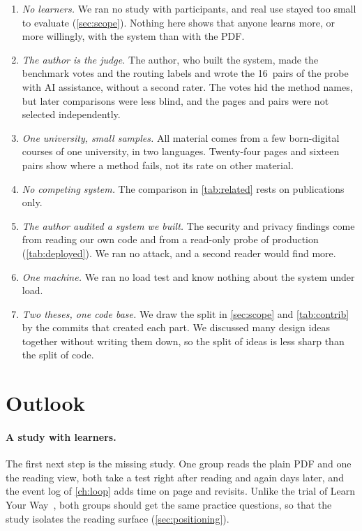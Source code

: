\begin{enumerate}
  \item \emph{No learners.} We ran no study with participants, and real use
    stayed too small to evaluate (\cref{sec:scope}). Nothing here shows that
    anyone learns more, or more willingly, with the system than with the PDF.
  \item \emph{The author is the judge.} The author, who built the system, made
    the benchmark votes and the routing labels and wrote the 16~pairs of the
    probe with AI assistance, without a second rater. The votes hid the method
    names, but later comparisons were less blind, and the pages and pairs were
    not selected independently.
  \item \emph{One university, small samples.} All material comes from a few
    born-digital courses of one university, in two languages. Twenty-four
    pages and sixteen pairs show where a method fails, not its rate on other
    material.
  \item \emph{No competing system.} The comparison in \cref{tab:related} rests
    on publications only.
  \item \emph{The author audited a system we built.} The security and
    privacy findings come from reading our own code and from a read-only probe
    of production (\cref{tab:deployed}). We ran no attack, and a second reader
    would find more.
  \item \emph{One machine.} We ran no load test and know nothing about the
    system under load.
  \item \emph{Two theses, one code base.} We draw the split in
    \cref{sec:scope} and \cref{tab:contrib} by the commits that created each part. We discussed many design ideas together
    without writing them down, so the split of ideas is less sharp than the
    split of code.
\end{enumerate}

\section{Outlook}
\label{sec:future-work}

\paragraph{A study with learners.}
The first next step is the missing study. One group reads the plain PDF and
one the reading view, both take a test right after reading and again days
later, and the event log of \cref{ch:loop} adds time on page and revisits.
Unlike the trial of Learn Your Way~\cite{learnlm2025textbook}, both groups
should get the same practice questions, so that the study isolates the
reading surface (\cref{sec:positioning}).

